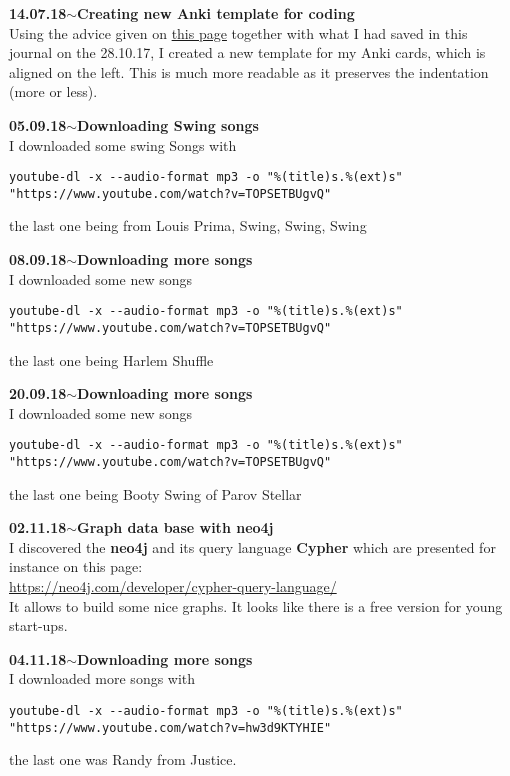 \documentclass[11pt,a4paper]{article}
\newenvironment{loggentry}[2]%
{\noindent\textbf{#1}\hspace{1cm}$\mathbf{\sim}$\text{ }\textbf{#2}\\}{\vspace{0.5cm}}
\begin{document}
\begin{loggentry}{14.07.18}{Creating new Anki template for coding}
Using the advice given on \href{http://anki.tenderapp.com/discussions/add-ons/11600-default-indentation-in-power-format-pack-add-on}{this page} together with what I had saved in this journal on the 28.10.17, I created a new template for my Anki cards, which is aligned on the left. This is much more readable as it preserves the indentation (more or less).
\end{loggentry}

\begin{loggentry}{05.09.18}{Downloading Swing songs}
I downloaded some swing Songs with
\begin{verbatim}
youtube-dl -x --audio-format mp3 -o "%(title)s.%(ext)s" "https://www.youtube.com/watch?v=TOPSETBUgvQ"
\end{verbatim}
the last one being from Louis Prima, Swing, Swing, Swing
\end{loggentry}

\begin{loggentry}{08.09.18}{Downloading more songs}
I downloaded some new songs
\begin{verbatim}
youtube-dl -x --audio-format mp3 -o "%(title)s.%(ext)s" "https://www.youtube.com/watch?v=TOPSETBUgvQ"
\end{verbatim}
the last one being Harlem Shuffle
\end{loggentry}

\begin{loggentry}{20.09.18}{Downloading more songs}
I downloaded some new songs
\begin{verbatim}
youtube-dl -x --audio-format mp3 -o "%(title)s.%(ext)s" "https://www.youtube.com/watch?v=TOPSETBUgvQ"
\end{verbatim}
the last one being Booty Swing of Parov Stellar
\end{loggentry}

\begin{loggentry}{02.11.18}{Graph data base with neo4j}
I discovered the \textbf{neo4j} and its query language \textbf{Cypher} which are presented for instance on this page:\\
\url{https://neo4j.com/developer/cypher-query-language/}\\
It allows to build some nice graphs. It looks like there is a free version for young start-ups.
\end{loggentry}

\begin{loggentry}{04.11.18}{Downloading more songs}
I downloaded more songs with
\begin{verbatim}
youtube-dl -x --audio-format mp3 -o "%(title)s.%(ext)s" "https://www.youtube.com/watch?v=hw3d9KTYHIE"
\end{verbatim}
the last one was Randy from Justice.
\end{loggentry}
\end{document}
